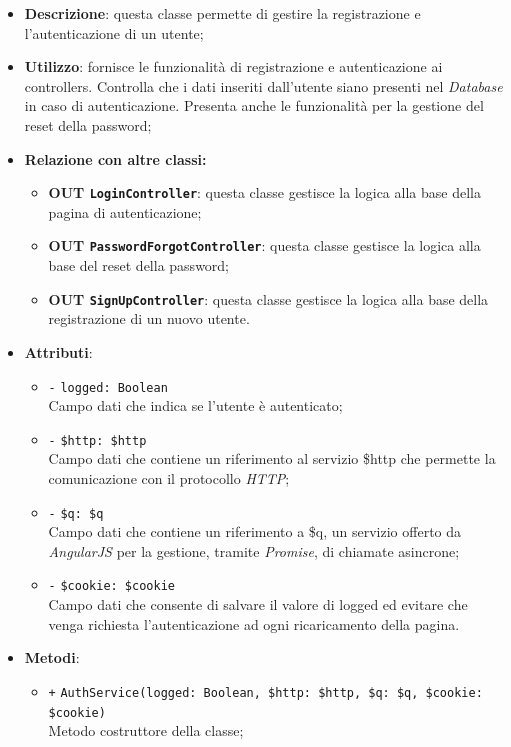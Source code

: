 \begin{itemize}
	\item \textbf{Descrizione}: questa classe permette di gestire la registrazione e l'autenticazione di un utente;
	\item \textbf{Utilizzo}: fornisce le funzionalità di registrazione e autenticazione ai controllers. Controlla che i dati inseriti dall'utente siano presenti nel \textit{Database} in caso di autenticazione. Presenta anche le funzionalità per la gestione del reset della password;
	\item \textbf{Relazione con altre classi:}
	\begin{itemize}
		\item \textbf{OUT \texttt{LoginController}}: questa classe gestisce la logica alla base della pagina di autenticazione;
		\item \textbf{OUT \texttt{PasswordForgotController}}: questa classe gestisce la logica alla base del reset della password;
		\item \textbf{OUT \texttt{SignUpController}}: questa classe gestisce la logica alla base della registrazione di un nuovo utente.
	\end{itemize}
	\item \textbf{Attributi}:
	\begin{itemize}
		\item \texttt{-} \texttt{logged: Boolean} \\ Campo dati che indica se l'utente è autenticato;
		\item \texttt{-} \texttt{\$http: \$http} \\ Campo dati che contiene un riferimento al servizio \$http che permette la comunicazione con il protocollo \textit{HTTP};
		\item \texttt{-} \texttt{\$q: \$q} \\ Campo dati che contiene un riferimento a \$q, un servizio offerto da \textit{AngularJS} per la gestione, tramite \textit{Promise}, di chiamate asincrone;
		\item \texttt{-} \texttt{\$cookie: \$cookie} \\ Campo dati che consente di salvare il valore di logged ed evitare che venga richiesta l'autenticazione ad ogni ricaricamento della pagina.
	\end{itemize}
	\item \textbf{Metodi}:
	\begin{itemize}
		\item \texttt{+} \texttt{AuthService(logged: Boolean, \$http: \$http, \$q: \$q, \$cookie: \$cookie)} \\ Metodo costruttore della classe; \\

\end{itemize}
\end{itemize}
